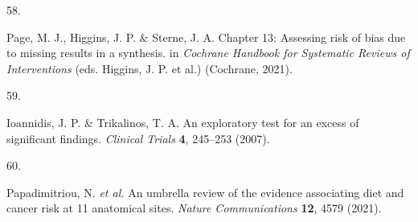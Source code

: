 \documentclass[
  english,
  man]{apa6}
\newlength{\cslhangindent}
\newlength{\csllabelwidth}
\newenvironment{CSLReferences}[2] %
 {%
  \setlength{\parindent}{0pt}
  \ifodd #1 \everypar{\setlength{\hangindent}{\cslhangindent}}\ignorespaces\fi
  \ifnum #2 > 0
  \setlength{\parskip}{#2\baselineskip}
  \fi
 }%
 {}
\newcommand{\CSLLeftMargin}[1]{\parbox[t]{\csllabelwidth}{#1}}
\newcommand{\CSLRightInline}[1]{\parbox[t]{\linewidth - \csllabelwidth}{#1}\break}
\begin{document}
\begin{CSLReferences}{0}{0}
\leavevmode{}%
\CSLLeftMargin{58. }
\CSLRightInline{Page, M. J., Higgins, J. P. \& Sterne, J. A. Chapter 13: {Assessing} risk of bias due to missing results in a synthesis. in \emph{Cochrane {Handbook} for {Systematic Reviews} of {Interventions}} (eds. Higgins, J. P. et al.) ({Cochrane}, 2021).}

\leavevmode{}%
\CSLLeftMargin{59. }
\CSLRightInline{Ioannidis, J. P. \& Trikalinos, T. A. An exploratory test for an excess of significant findings. \emph{Clinical Trials} \textbf{4}, 245--253 (2007).}

\leavevmode{}%
\CSLLeftMargin{60. }
\CSLRightInline{Papadimitriou, N. \emph{et al.} An umbrella review of the evidence associating diet and cancer risk at 11 anatomical sites. \emph{Nature Communications} \textbf{12}, 4579 (2021).}

\end{CSLReferences}

\newpage
\end{document}
